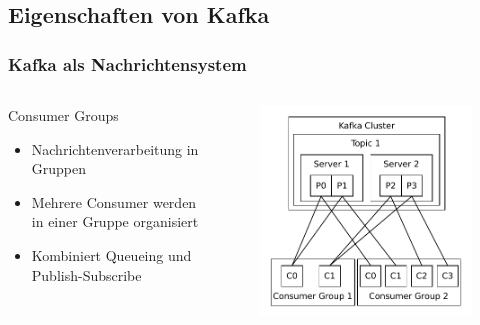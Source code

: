 
\subsection{Eigenschaften von Kafka}
\begin{frame}
\frametitle{Kafka als Nachrichtensystem}
\centering
\begin{columns}[T] %
	\begin{column}[T]{.5\textwidth} 
		Consumer Groups
		\begin{itemize}
			\item Nachrichtenverarbeitung in Gruppen
			\item Mehrere Consumer werden in einer Gruppe organisiert
			\item Kombiniert Queueing und Publish-Subscribe
		\end{itemize}
	\end{column}
	\begin{column}[T]{.5\textwidth}
		\begin{figure}
		\centering
		\includegraphics[scale=0.7]{figure/consumer_groups.pdf}
		\end{figure}
	\end{column}
\end{columns}

\end{frame}

